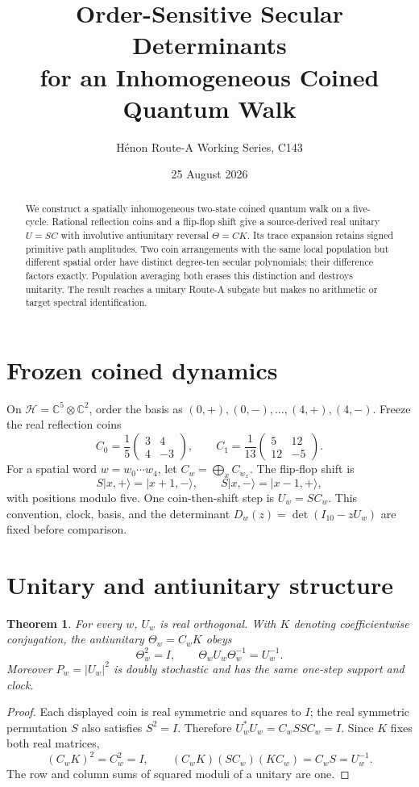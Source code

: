 \documentclass[11pt]{article}
\title{Order-Sensitive Secular Determinants\\for an Inhomogeneous Coined Quantum Walk}
\author{H\'enon Route-A Working Series, C143}
\date{25 August 2026}
\newtheorem{theorem}{Theorem}
\begin{document}
\maketitle
\begin{abstract}
We construct a spatially inhomogeneous two-state coined quantum walk on a
five-cycle.  Rational reflection coins and a flip-flop shift give a
source-derived real unitary $U=SC$ with involutive antiunitary reversal
$\Theta=CK$.  Its trace expansion retains signed primitive path amplitudes.
Two coin arrangements with the same local population but different spatial
order have distinct degree-ten secular polynomials; their difference factors
exactly.  Population averaging both erases this distinction and destroys
unitarity.  The result reaches a unitary Route-A subgate but makes no
arithmetic or target spectral identification.
\end{abstract}

\section{Frozen coined dynamics}
On $\mathcal H=\mathbb C^5\otimes\mathbb C^2$, order the basis as
$(0,+),(0,-),\ldots,(4,+),(4,-)$.  Freeze the real reflection coins
\[
 C_0=\frac15\begin{pmatrix}3&4\\4&-3\end{pmatrix},\qquad
 C_1=\frac1{13}\begin{pmatrix}5&12\\12&-5\end{pmatrix}.
\]
For a spatial word $w=w_0\cdots w_4$, let
$C_w=\bigoplus_xC_{w_x}$.  The flip-flop shift is
\[
 S|x,+\rangle=|x+1,-\rangle,\qquad
 S|x,-\rangle=|x-1,+\rangle,
\]
with positions modulo five.  One coin-then-shift step is
$U_w=SC_w$.  This convention, clock, basis, and the determinant
$D_w(z)=\det(I_{10}-zU_w)$ are fixed before comparison.

\section{Unitary and antiunitary structure}
\begin{theorem}\label{thm:unitary}
For every $w$, $U_w$ is real orthogonal.  With $K$ denoting coefficientwise
conjugation, the antiunitary $\Theta_w=C_wK$ obeys
\[
 \Theta_w^2=I,\qquad
 \Theta_wU_w\Theta_w^{-1}=U_w^{-1}.
\]
Moreover $P_w=|U_w|^2$ is doubly stochastic and has the same one-step
support and clock.
\end{theorem}
\begin{proof}
Each displayed coin is real symmetric and squares to $I$; the real symmetric
permutation $S$ also satisfies $S^2=I$.  Therefore
$U_w^*U_w=C_wSS C_w=I$.  Since $K$ fixes both real matrices,
\[
 (C_wK)^2=C_w^2=I,\qquad
 (C_wK)(SC_w)(KC_w)=C_wS=U_w^{-1}.
\]
The row and column sums of squared moduli of a unitary are one.
\end{proof}
\end{document}
